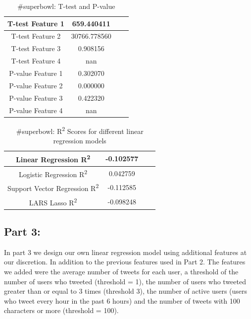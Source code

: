 \documentclass[12pt]{article}
\begin{document}
\begin{table}[H]
	\centering
	\begin{tabular}{| c | c | c | c |}
		\hline 
		T-test Feature 1 & 659.440411 \\\hline
		T-test Feature 2 & 30766.778560 \\\hline
		T-test Feature 3 & 0.908156 \\\hline 
		T-test Feature 4 & nan \\\hline
		P-value Feature 1 & 0.302070 \\\hline
		P-value Feature 2 & 0.000000 \\\hline
		P-value Feature 3 & 0.422320 \\\hline
		P-value Feature 4 & nan \\\hline
	\end{tabular} 
	\caption{\#superbowl: T-test and P-value}
	\label{part1:tab1}
\end{table} 


\begin{table}[H]
	\centering
	\begin{tabular}{| c | c | c | c |}
		\hline 
		Linear Regression R\textsuperscript2  & -0.102577 \\\hline
		Logistic Regression R\textsuperscript2  & 0.042759 \\\hline
		Support Vector Regression R\textsuperscript2  & -0.112585 \\\hline
		LARS Lasso R\textsuperscript2  & -0.098248 \\\hline
	\end{tabular} 
	\caption{\#superbowl: R\textsuperscript2 Scores for different linear regression models}
	\label{part1:tab1}
\end{table} 


\subsection{Part 3:}

In part 3 we design our own linear regression model using additional features at our discretion. In addition to the previous features used in Part 2. The features we added were the average number of tweets for each user, a threshold of the number of users who tweeted (threshold = 1), the number of users who tweeted greater than or equal to 3 times (threshold 3), the number of active users (users who tweet every hour in the past 6 hours) and the number of tweets with 100 characters or more (threshold = 100).
\end{document}
